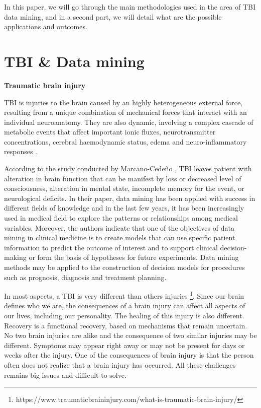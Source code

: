 \documentclass[runningheads]{llncs}
\begin{document}
In this paper, we will go through the main methodologies used in the area of TBI data mining, and in a second part, we will detail what are the possible applications and outcomes.

\section{TBI \& Data mining}
\noindent
\textbf{Traumatic brain injury}

TBI is injuries to the brain caused by an highly heterogeneous external force, resulting from a unique combination of mechanical forces that interact with an individual neuroanatomy. They are also dynamic, involving a complex cascade of metabolic events that affect important ionic fluxes, neurotransmitter concentrations, cerebral haemodynamic status, edema and neuro-inflammatory responses \cite{mitra_statistical_2016}.

According to the study conducted by Marcano-Cedeño \cite{marcano-cedeno_artificial_2013}, TBI leaves patient with alteration in brain function that can be manifest by loss or decreased level of consciousness, alteration in mental state, incomplete memory for the event, or neurological deficits. In their paper, data mining has been applied with success in different fields of knowledge and in the last few years, it has been increasingly used in medical field to explore the patterns or relationships among medical variables.
Moreover, the authors indicate that one of the objectives of data mining in clinical medicine is to create models that can use specific patient information to predict the outcome of interest and to support clinical decision-making or form the basis of hypotheses for future experiments. Data mining methods may be applied to the construction of decision models for procedures such as prognosis, diagnosis and treatment planning. 

In most aspects, a TBI is very different than others injuries \footnote{https://www.traumaticbraininjury.com/what-is-traumatic-brain-injury/}. Since our brain defines who we are, the consequences of a brain injury can affect all aspects of our lives, including our personality. The healing of this injury is also different. Recovery is a functional recovery, based on mechanisms that remain uncertain. No two brain injuries are alike and the consequence of two similar injuries may be different. Symptoms may appear right away or may not be present for days or weeks after the injury. One of the consequences of brain injury is that the person often does not realize that a brain injury has occurred. All these challenges remains big issues and difficult to solve.
\end{document}
